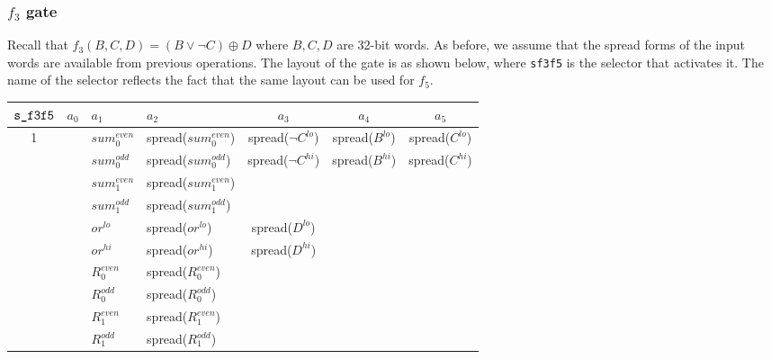 \documentclass[10pt]{article}
\begin{document}
\subsubsection{$f_3$ gate}%
\label{sec:f3_gate}
Recall that $f_3(B,C,D) = (B \vee \lnot C) \oplus D$ where $B,C,D$ are 32-bit words. As before, we assume that the spread forms of the input words are available from previous operations. The layout of the gate is as shown below, where \texttt{s\textunderscore f3f5} is the selector that activates it. The name of the selector reflects the fact that the same layout can be used for $f_5$.
\begin{center}
  \begin{tabular}{c|c|l|l|c|c|c}
    $\texttt{s\textunderscore f3f5}$ & $a_0$ & $a_1$ & $a_2$ & $a_3$ & $a_4$ & $a_5$ \\ \hline
    1  &     & $sum_0^{even}$ & spread($sum_0^{even}$) & spread($\lnot C^{lo}$) & spread($B^{lo}$)  & spread($C^{lo}$)  \\ 
       &     & $sum_0^{odd}$  & spread($sum_0^{odd}$)  & spread($\lnot C^{hi}$) & spread($B^{hi}$)  & spread($C^{hi}$)  \\ 
       &     & $sum_1^{even}$ & spread($sum_1^{even}$) &                        &                   &                   \\ 
       &     & $sum_1^{odd}$  & spread($sum_1^{odd}$)  &                        &                   &                   \\
       &     & $or^{lo}$      & spread($or^{lo}$)      & spread($D^{lo}$)       &                   &                   \\ 
       &     & $or^{hi}$      & spread($or^{hi}$)      & spread($D^{hi}$)       &                   &                   \\ 
       &     & $R_0^{even}$   & spread($R_0^{even}$)   &                        &                   &                   \\ 
       &     & $R_0^{odd}$    & spread($R_0^{odd}$)    &                        &                   &                   \\ 
       &     & $R_1^{even}$   & spread($R_1^{even}$)   &                        &                   &                   \\ 
       &     & $R_1^{odd}$    & spread($R_1^{odd}$)    &                        &                   &                   \\ \hline
  \end{tabular}
\end{center}
\end{document}
